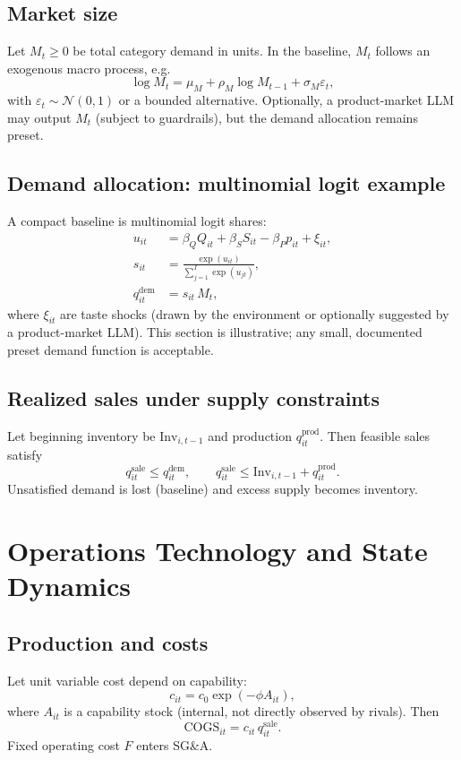 \documentclass[11pt]{article}
\begin{document}
\subsection{Market size}
Let $M_t\ge 0$ be total category demand in units. In the baseline, $M_t$ follows an exogenous macro process, e.g.
\[
\log M_t = \mu_M + \rho_M \log M_{t-1} + \sigma_M \varepsilon_t,
\]
with $\varepsilon_t\sim \mathcal{N}(0,1)$ or a bounded alternative. Optionally, a product-market LLM may output $M_t$ (subject to guardrails), but the demand allocation remains preset.

\subsection{Demand allocation: multinomial logit example}
A compact baseline is multinomial logit shares:
\begin{align}
u_{it} &= \beta_Q Q_{it} + \beta_S S_{it} - \beta_P p_{it} + \xi_{it},\\
s_{it} &= \frac{\exp(u_{it})}{\sum_{j=1}^I \exp(u_{jt})},\\
q^{\text{dem}}_{it} &= s_{it}\, M_t,
\end{align}
where $\xi_{it}$ are taste shocks (drawn by the environment or optionally suggested by a product-market LLM). This section is illustrative; any small, documented preset demand function is acceptable.

\subsection{Realized sales under supply constraints}
Let beginning inventory be $\text{Inv}_{i,t-1}$ and production $q^{\text{prod}}_{it}$. Then feasible sales satisfy
\[
q^{\text{sale}}_{it}\le q^{\text{dem}}_{it},\qquad q^{\text{sale}}_{it}\le \text{Inv}_{i,t-1}+q^{\text{prod}}_{it}.
\]
Unsatisfied demand is lost (baseline) and excess supply becomes inventory.

\section{Operations Technology and State Dynamics}

\subsection{Production and costs}
Let unit variable cost depend on capability:
\[
c_{it} = c_0 \exp(-\phi A_{it}),
\]
where $A_{it}$ is a capability stock (internal, not directly observed by rivals). Then
\[
\text{COGS}_{it}=c_{it}\, q^{\text{sale}}_{it}.
\]
Fixed operating cost $F$ enters SG\&A.
\end{document}
